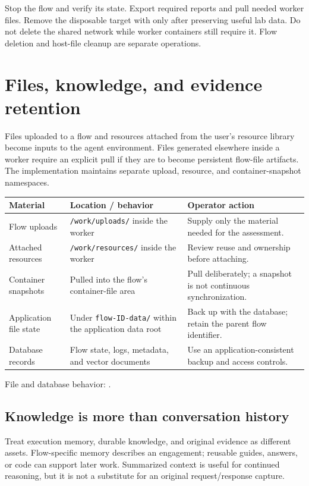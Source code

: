 \documentclass[11pt,letterpaper]{article}
\newcommand{\code}[1]{\nolinkurl{#1}}
\newcommand{\src}[1]{\cite{#1}}
\newcommand{\smallhead}[1]{\par\medskip{\sffamily\bfseries\color{Navy}#1}\par}
\begin{document}
\smallhead{Cleanup}
Stop the flow and verify its state. Export required reports and pull needed
worker files. Remove the disposable target with \texttt{}
only after preserving useful lab data. Do not delete the shared network while
worker containers still require it. Flow deletion and host-file cleanup are
separate operations.

\clearpage
\section{Files, knowledge, and evidence retention}
\label{sec:files}
Files uploaded to a flow and resources attached from the user's resource library
become inputs to the agent environment. Files generated elsewhere inside a
worker require an explicit pull if they are to become persistent flow-file
artifacts. The implementation maintains separate upload, resource, and
container-snapshot namespaces. \src{files}

\begin{tabularx}{\textwidth}{@{}L{0.22\textwidth}L{0.32\textwidth}Y@{}}
\toprule
\textbf{Material} & \textbf{Location / behavior} & \textbf{Operator action}\\
\midrule
Flow uploads & \code{/work/uploads/} inside the worker &
Supply only the material needed for the assessment.\\
Attached resources & \code{/work/resources/} inside the worker &
Review reuse and ownership before attaching.\\
Container snapshots & Pulled into the flow's container-file area &
Pull deliberately; a snapshot is not continuous synchronization.\\
Application file state & Under \code{flow-ID-data/} within the application data root &
Back up with the database; retain the parent flow identifier.\\
Database records & Flow state, logs, metadata, and vector documents &
Use an application-consistent backup and access controls.\\
\bottomrule
\end{tabularx}
{\small File and database behavior: \src{files,database}.}

\subsection{Knowledge is more than conversation history}
Treat execution memory, durable knowledge, and original evidence as different
assets. Flow-specific memory describes an engagement; reusable guides, answers,
or code can support later work. Summarized context is useful for continued
reasoning, but it is not a substitute for an original request/response capture.
\src{database,summary}
\end{document}
